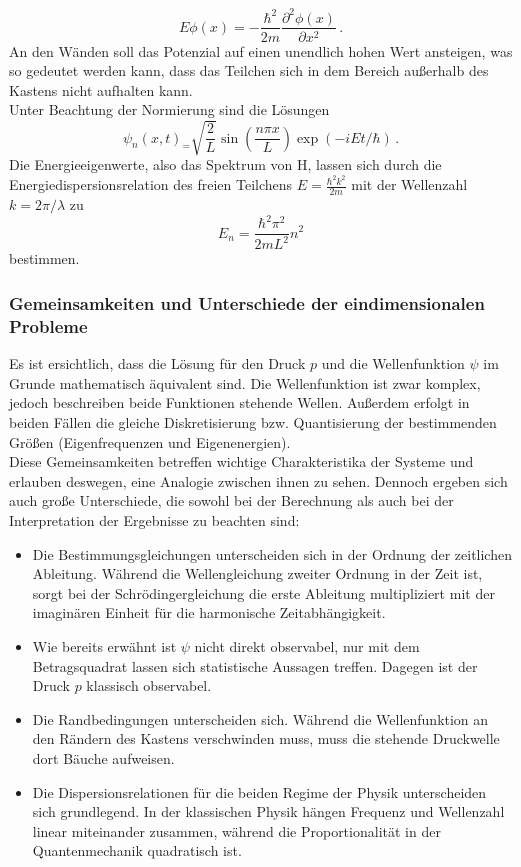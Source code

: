 \begin{equation}
  E \phi(x) = - \frac{\hbar^2}{2 m}  \frac{\partial^2 \phi(x)} {\partial x^2} \,.
  \label{eqn:schroedingerKasten}
\end{equation}
An den Wänden soll das Potenzial auf einen unendlich hohen Wert ansteigen, was so gedeutet werden kann, dass das Teilchen sich in dem Bereich außerhalb des Kastens nicht aufhalten kann.\\
Unter Beachtung der Normierung sind die Lösungen
\begin{equation}
  \psi_n(x,t)_ = \sqrt{\frac{2}{L}} \sin\left(\frac{n \pi x}{L}\right) \exp(-i E t / \hbar)\,.
  \label{eqn:kastenLoesung}
\end{equation}
Die Energieeigenwerte, also das Spektrum von H, lassen sich durch die Energiedispersionsrelation des freien Teilchens $E = \frac{\hbar^2 k^2}{2m}$ mit der Wellenzahl $k = 2 \pi / \lambda$ zu
\begin{equation}
  E_n = \frac{\hbar^2 \pi^2}{2 m L^2} n^2
  \label{eqn:kastenEnergien}
\end{equation}
bestimmen.

\subsubsection{Gemeinsamkeiten und Unterschiede der eindimensionalen Probleme}
Es ist ersichtlich, dass die Lösung für den Druck $p$ und die Wellenfunktion $\psi$ im Grunde mathematisch äquivalent sind. Die Wellenfunktion ist zwar komplex, jedoch beschreiben beide Funktionen stehende Wellen. Außerdem erfolgt in beiden Fällen die gleiche Diskretisierung bzw. Quantisierung der bestimmenden Größen (Eigenfrequenzen und Eigenenergien).\\
Diese Gemeinsamkeiten betreffen wichtige Charakteristika der Systeme und erlauben deswegen, eine Analogie zwischen ihnen zu sehen. Dennoch ergeben sich auch große Unterschiede, die sowohl bei der Berechnung als auch bei der Interpretation der Ergebnisse zu beachten sind:
\begin{itemize}
  \item Die Bestimmungsgleichungen unterscheiden sich in der Ordnung der zeitlichen Ableitung. Während die Wellengleichung zweiter Ordnung in der Zeit ist, sorgt bei der Schrödingergleichung die erste Ableitung multipliziert mit der imaginären Einheit für die harmonische Zeitabhängigkeit.
  \item Wie bereits erwähnt ist $\psi$ nicht direkt observabel, nur mit dem Betragsquadrat lassen sich statistische Aussagen treffen. Dagegen ist der Druck $p$ klassisch observabel.
  \item Die Randbedingungen unterscheiden sich. Während die Wellenfunktion an den Rändern des Kastens verschwinden muss, muss die stehende Druckwelle dort Bäuche aufweisen.
  \item Die Dispersionsrelationen für die beiden Regime der Physik unterscheiden sich grundlegend. In der klassischen Physik hängen Frequenz und Wellenzahl linear miteinander zusammen, während die Proportionalität in der Quantenmechanik quadratisch ist.
\end{itemize}

